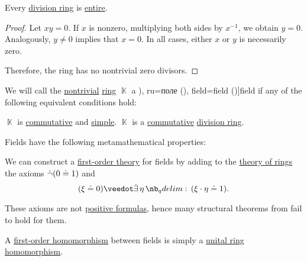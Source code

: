 \begin{proposition}\label{thm:division_ring_is_entire}
  Every \hyperref[def:division_ring]{division ring} is \hyperref[def:entire_semiring]{entire}.
\end{proposition}
\begin{proof}
  Let \( xy = 0 \). If \( x \) is nonzero, multiplying both sides by \( x^{-1} \), we obtain \( y = 0 \). Analogously, \( y \neq 0 \) implies that \( x = 0 \). In all cases, either \( x \) or \( y \) is necessarily zero.

  Therefore, the ring has no nontrivial zero divisors.
\end{proof}

\begin{definition}\label{def:field}
  We will call the \hyperref[def:ring/trivial]{nontrivial} \hyperref[def:ring]{ring} \( \BbbK \) a \term[bg=поле (\cite[394]{Обрешков1962ВисшаАлгебра}), ru=поле (\cite[def. 1.3.2]{Винберг2014Алгебра}), field=field (\cite[91]{Jacobson1985AlgebraPart1})]{field} if any of the following equivalent conditions hold:
  \begin{thmenum}
     \( \BbbK \) is \hyperref[def:ring/commutative]{commutative} and \hyperref[def:simple_object]{simple}.
     \( \BbbK \) is a \hyperref[def:ring/commutative]{commutative} \hyperref[def:division_ring]{division ring}.
  \end{thmenum}

  Fields have the following metamathematical properties:
  \begin{thmenum}
    \mimprovised We can construct a \hyperref[def:first_order_theory]{first-order theory} for fields by adding to the \hyperref[def:semiring/theory]{theory of rings} the axioms \( \dot\neg (0 \doteq 1) \) and
    \begin{equation}\label{eq:def:field/theory/invertibility}
      (\xi \syneq 0) \synvee \qexists \eta (\xi \cdot \eta \syneq 1).
    \end{equation}

    These axioms are not \hyperref[def:positive_formula]{positive formulas}, hence many structural theorems from  fail to hold for them.

     A \hyperref[def:first_order_homomorphism]{first-order homomorphism} between fields is simply a \hyperref[def:ring/homomorphism]{unital ring homomorphism}.


\end{thmenum}
\end{definition}
